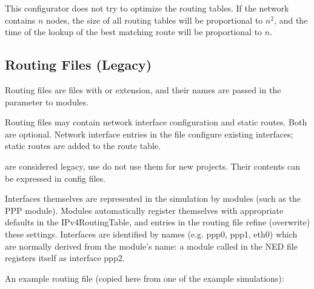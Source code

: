 \begin{note}
This configurator does not try to optimize the routing tables.
If the network contains $n$ nodes, the size of all routing tables
will be proportional to $n^2$, and the time of the lookup of the
best matching route will be proportional to $n$.
\end{note}


\subsection{Routing Files (Legacy)}
\label{sec:autoconfig:routing-files}

Routing files are files with  or  extension,
and their names are passed in the  parameter
to  modules.

Routing files may contain network interface configuration and static
routes. Both are optional. Network interface entries in the file
configure existing interfaces; static routes are added to the route table.

\begin{warning}
 are considered legacy, use do not use them for new
projects. Their contents can be expressed in 
config files.
\end{warning}

Interfaces themselves are represented in the simulation by modules
(such as the PPP module). Modules automatically register themselves
with appropriate defaults in the IPv4RoutingTable, and entries in the
routing file refine (overwrite) these settings.
Interfaces are identified by names (e.g. ppp0, ppp1, eth0) which
are normally derived from the module's name: a module called
 in the NED file registers itself as interface ppp2.

An example routing file (copied here from one of the example simulations):

